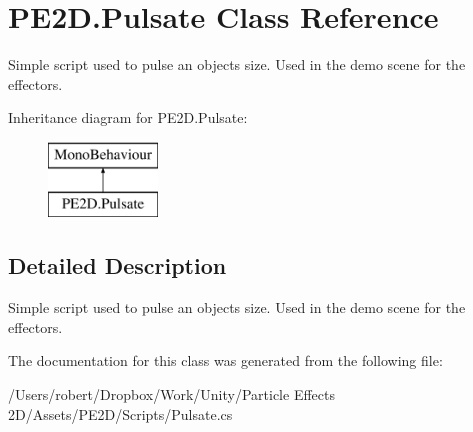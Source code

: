 \hypertarget{class_p_e2_d_1_1_pulsate}{}\section{P\+E2\+D.\+Pulsate Class Reference}
\label{class_p_e2_d_1_1_pulsate}


Simple script used to pulse an objects size. Used in the demo scene for the effectors.  


Inheritance diagram for P\+E2\+D.\+Pulsate\+:\begin{figure}[H]
\begin{center}
\leavevmode
\includegraphics[height=2.000000cm]{class_p_e2_d_1_1_pulsate}
\end{center}
\end{figure}


\subsection{Detailed Description}
Simple script used to pulse an objects size. Used in the demo scene for the effectors. 



The documentation for this class was generated from the following file\+:\begin{DoxyCompactItemize}
\item 
/\+Users/robert/\+Dropbox/\+Work/\+Unity/\+Particle Effects 2\+D/\+Assets/\+P\+E2\+D/\+Scripts/Pulsate.\+cs\end{DoxyCompactItemize}
